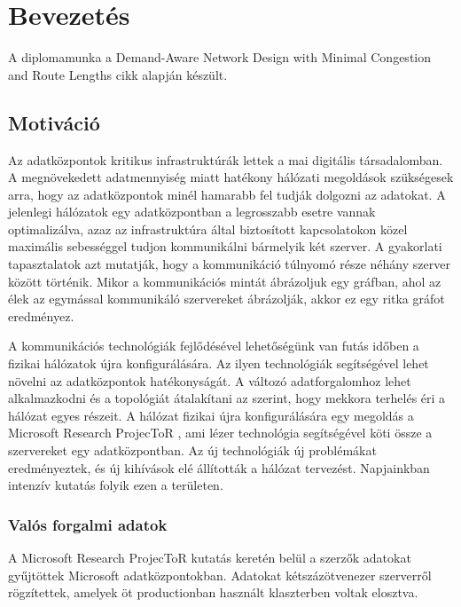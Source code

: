 \documentclass[12pt]{report}
\begin{document}
\tableofcontents
	
\chapter{Bevezetés}

A diplomamunka a Demand-Aware Network Design with Minimal Congestion and Route Lengths \cite{avin_demand-aware_nodate} cikk alapján készült.

\section{Motiváció}

Az adatközpontok kritikus infrastruktúrák lettek a mai digitális társadalomban. 
A megnövekedett adatmennyiség miatt hatékony hálózati megoldások szükségesek arra, hogy az adatközpontok minél hamarabb fel tudják dolgozni az adatokat. 
A jelenlegi hálózatok egy adatközpontban a legrosszabb esetre vannak optimalizálva, azaz az infrastruktúra által biztosított kapcsolatokon közel maximális sebességgel tudjon kommunikálni bármelyik két szerver. 
A gyakorlati tapasztalatok azt mutatják, hogy a kommunikáció túlnyomó része néhány szerver között történik. 
Mikor a kommunikációs mintát ábrázoljuk egy gráfban, ahol az élek az egymással kommunikáló szervereket ábrázolják, akkor ez egy ritka gráfot eredményez.

A kommunikációs technológiák fejlődésével lehetőségünk van futás időben a fizikai hálózatok újra konfigurálására. 
Az ilyen technológiák segítségével lehet növelni az adatközpontok hatékonyságát. 
A változó adatforgalomhoz lehet alkalmazkodni és a topológiát átalakítani az szerint, hogy mekkora terhelés éri a hálózat egyes részeit. 
A hálózat fizikai újra konfigurálására egy megoldás a Microsoft Research ProjecToR \cite{ghobadi_projector:_2016}, ami lézer technológia segítségével köti össze a szervereket egy adatközpontban. 
Az új technológiák új problémákat eredményeztek, és új kihívások elé állították a hálózat tervezést.
Napjainkban intenzív kutatás folyik ezen a területen.

\pagebreak

\subsection{Valós forgalmi adatok}

A Microsoft Research ProjecToR kutatás keretén belül a szerzők adatokat gyűjtöttek Microsoft adatközpontokban. 
Adatokat kétszázötvenezer szerverről rögzítettek, amelyek öt productionban használt klaszterben voltak elosztva. 
\end{document}
